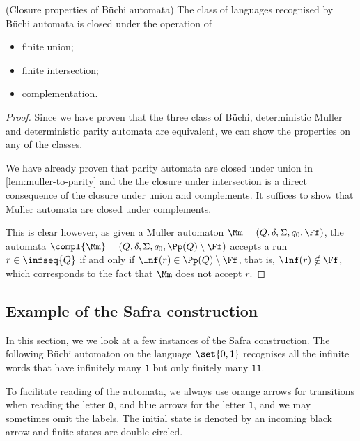 \begin{theorem}(Closure properties of Büchi automata)
    \label{thm:closure-of-buchi}
    The class of languages recognised by Büchi automata
    is closed under the operation of \begin{itemize}
        \item finite union;
        \item finite intersection;
        \item complementation.
    \end{itemize}
\end{theorem}
\begin{proof}
    Since we have proven that the three class of Büchi,
    deterministic Muller and deterministic parity automata
    are equivalent, we can show the properties on any of the classes.

    We have already proven that parity automata are closed
    under union in \autoref{lem:muller-to-parity}
    and the the closure under intersection
    is a direct consequence of the closure under union and complements.
    It suffices to show that Muller automata are closed under complements.

    This is clear however, as given a Muller automaton $\Mm = (Q, \delta, \Sigma, q_0, \Ff)$,
    the automata $\compl{\Mm} = (Q, \delta, \Sigma, q_0, \Pp(Q) \setminus \Ff)$
    accepts a run $r \in \infseq{Q}$ if and only if $\Inf(r) \in \Pp(Q) \setminus \Ff$, that is,
    $\Inf(r) \notin \Ff$, which corresponds to the fact that $\Mm$ does not accept $r$.
\end{proof}

\subsection{Example of the Safra construction}\label{sec:safra-examples}

In this section, we we look at a few instances of the Safra construction.
The following Büchi automaton on the language $\set{0, 1}$ recognises
all the infinite words that have infinitely many \verb|1| but only finitely many \verb|11|.

\begin{center}
    
\end{center}

To facilitate reading of the automata, we always use orange arrows for
transitions when reading the letter \verb|0|, and blue arrows for the letter \verb|1|,
and we may sometimes omit the labels. The initial state is denoted by
an incoming black arrow and finite states are double circled.


